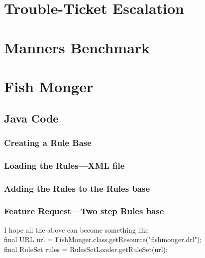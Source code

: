 \cleardoublepage
\chapter{Trouble-Ticket Escalation}

\cleardoublepage
\chapter{Manners Benchmark}



\cleardoublepage
\chapter{Fish Monger}
\section{Java Code}
\subsection{Creating a Rule Base}

\subsection{Loading the Rules---XML file}

\subsection{Adding the Rules to the Rules base}

\subsection{Feature Request---Two step Rules base}
I hope all the above can become something like\\
final URL url = FishMonger.class.getResource("fishmonger.drl");\\
final RuleSet rules = RulesSetLoader.getRuleSet(url);


